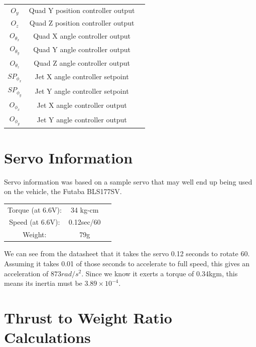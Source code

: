 \documentclass[11pt]{article}
\begin{document}
\begin{center}
\begin{longtable}{|ccc|}
    $O_y$ & Quad Y position controller output & \\
    $O_z$ & Quad Z position controller output & \\
    $O_{\theta_x}$ & Quad X angle controller output & \\
    $O_{\theta_y}$ & Quad Y angle controller output & \\
    $O_{\theta_z}$ & Quad Z angle controller output & \\
    $SP_{\phi_x}$ & Jet X angle controller setpoint & \\
    $SP_{\phi_y}$ & Jet Y angle controller setpoint & \\
    $O_{\phi_x}$ & Jet X angle controller output & \\
    $O_{\phi_y}$ & Jet Y angle controller output & \\
    \hline
\end{longtable}
\end{center}

\section{Servo Information} \label{app:servo_info}
Servo information was based on a sample servo that may well end up being used on the vehicle, the Futaba BLS177SV.

\begin{center}
\begin{tabular}{ccc}
    Torque (at 6.6V): & 34 kg-cm \\
    Speed (at 6.6V): & 0.12sec/60\textdegree{} \\
    Weight: & 79g \\
\end{tabular}
\end{center}

We can see from the datasheet that it takes the servo 0.12 seconds to rotate 60\textdegree{}. Assuming it takes 0.01 of those seconds to accelerate to full speed, this gives an acceleration of $873rad/s^2$. Since we know it exerts a torque of 0.34kgm, this means its inertia must be $3.89\times10^{-4}$.

\section{Thrust to Weight Ratio Calculations} \label{app:thrust_to_weight}
\end{document}
